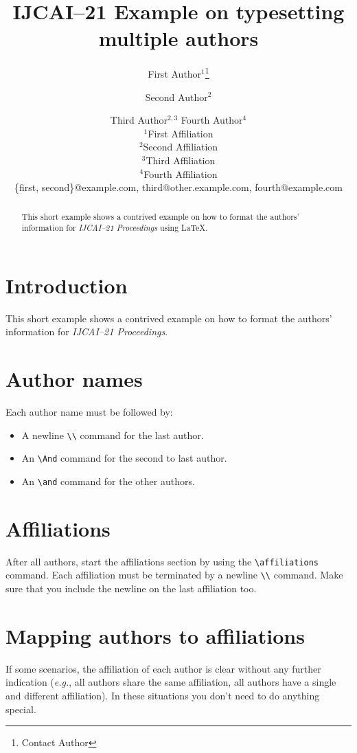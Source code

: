 \documentclass{article}
\title{IJCAI--21 Example on typesetting multiple authors}
\author{
First Author$^1$\footnote{Contact Author}\and
Second Author$^2$\and
Third Author$^{2,3}$\And
Fourth Author$^4$\\
\affiliations
$^1$First Affiliation\\
$^2$Second Affiliation\\
$^3$Third Affiliation\\
$^4$Fourth Affiliation\\
\emails
\{first, second\}@example.com,
third@other.example.com,
fourth@example.com
}
\begin{document}
\maketitle

\begin{abstract}
This short example shows a contrived example on how to format the authors' information for {\it IJCAI--21 Proceedings} using \LaTeX{}.
\end{abstract}

\section{Introduction}

This short example shows a contrived example on how to format the authors' information for {\it IJCAI--21 Proceedings}.

\section{Author names}

Each author name must be followed by:
\begin{itemize}
    \item A newline {\tt \textbackslash{}\textbackslash{}} command for the last author.
    \item An {\tt \textbackslash{}And} command for the second to last author.
    \item An {\tt \textbackslash{}and} command for the other authors.
\end{itemize}

\section{Affiliations}

After all authors, start the affiliations section by using the {\tt \textbackslash{}affiliations} command.
Each affiliation must be terminated by a newline {\tt \textbackslash{}\textbackslash{}} command. Make sure that you include the newline on the last affiliation too.

\section{Mapping authors to affiliations}

If some scenarios, the affiliation of each author is clear without any further indication (\emph{e.g.}, all authors share the same affiliation, all authors have a single and different affiliation). In these situations you don't need to do anything special.
\end{document}
